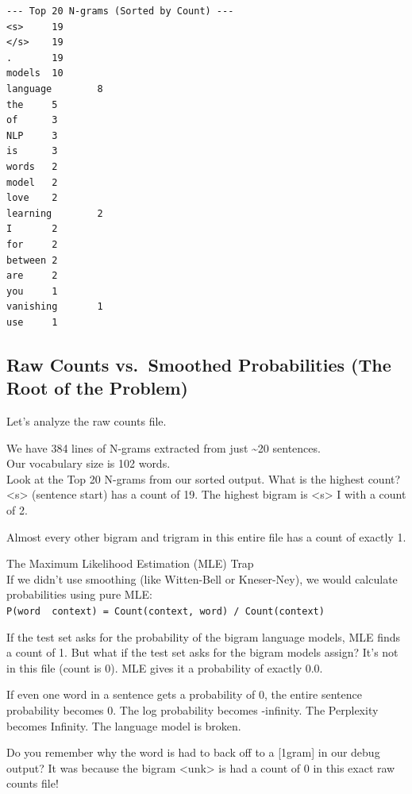 \documentclass[11pt]{article}
\begin{document}
    \begin{Verbatim}[commandchars=\\\{\}]
--- Top 20 N-grams (Sorted by Count) ---
<s>     19
</s>    19
.       19
models  10
language        8
the     5
of      3
NLP     3
is      3
words   2
model   2
love    2
learning        2
I       2
for     2
between 2
are     2
you     1
vanishing       1
use     1
    \end{Verbatim}

    \hypertarget{raw-counts-vs.-smoothed-probabilities-the-root-of-the-problem}{%
\subsection{Raw Counts vs.~Smoothed Probabilities (The Root of the
Problem)}\label{raw-counts-vs.-smoothed-probabilities-the-root-of-the-problem}}

Let's analyze the raw counts file.

We have 384 lines of N-grams extracted from just \textasciitilde20
sentences.\\
Our vocabulary size is 102 words.\\
Look at the Top 20 N-grams from our sorted output. What is the highest
count? \textless s\textgreater{} (sentence start) has a count of 19. The
highest bigram is \textless s\textgreater{} I with a count of 2.

Almost every other bigram and trigram in this entire file has a count of
exactly 1.

The Maximum Likelihood Estimation (MLE) Trap\\
If we didn't use smoothing (like Witten-Bell or Kneser-Ney), we would
calculate probabilities using pure MLE:
\texttt{P(word\ \textbar{}\ context)\ =\ Count(context,\ word)\ /\ Count(context)}

If the test set asks for the probability of the bigram language models,
MLE finds a count of 1. But what if the test set asks for the bigram
models assign? It's not in this file (count is 0). MLE gives it a
probability of exactly 0.0.

If even one word in a sentence gets a probability of 0, the entire
sentence probability becomes 0. The log probability becomes -infinity.
The Perplexity becomes Infinity. The language model is broken.

Do you remember why the word is had to back off to a {[}1gram{]} in our
debug output? It was because the bigram \textless unk\textgreater{} is
had a count of 0 in this exact raw counts file!
\end{document}
